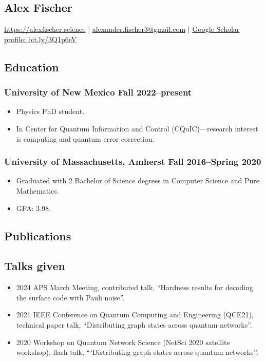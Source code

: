 \documentclass{article}
\begin{document}
	\begin{center}
		\section*{Alex Fischer}
			\href{https://alexfischer.science}{https://alexfischer.science} |
			\href{mailto:alexander.fischer3@gmail.com}{alexander.fischer3@gmail.com} | \href{https://scholar.google.com/citations?user=CfhWaI4AAAAJ&hl=en}{Google Scholar profile: bit.ly/3Q1p6eV}
    \end{center}
	\subsection*{Education}
		\subsubsection*{University of New Mexico \hfill \normalfont \normalsize Fall 2022--present}
			\begin{itemize}
				\item Physics PhD student.
				\item In Center for Quantum Information and Control (CQuIC)---research interest is computing and quantum error correction.
			\end{itemize}
		\subsubsection*{University of Massachusetts, Amherst \hfill \normalfont \normalsize Fall 2016--Spring 2020}
			\begin{itemize}
				\item Graduated with 2 Bachelor of Science degrees in Computer Science and Pure Mathematics.
				\item GPA: 3.98.
			\end{itemize}
	\subsection*{Publications}
		\nocite{*}
		
		{}
	\subsection*{Talks given}
		\begin{itemize}
			\item 2024 APS March Meeting, contributed talk, ``Hardness results for decoding the surface code with Pauli noise''.
			\item 2021 IEEE Conference on Quantum Computing and Engineering (QCE21), technical paper talk, ``Distributing graph states across quantum networks''.
			\item 2020 Workshop on Quantum Network Science (NetSci 2020 satellite workshop), flash talk, ```Distributing graph states across quantum networks''.
		\end{itemize}
\end{document}
